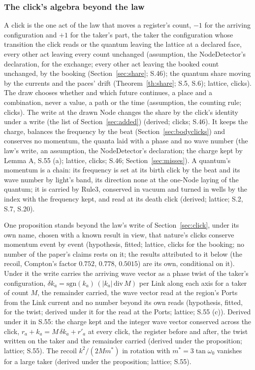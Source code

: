 \documentclass[pdflatex,sn-mathphys-num]{sn-jnl}
\theoremstyle{thmstyleone}
\theoremstyle{thmstyletwo}
\begin{document}
\subsubsection{The click's algebra beyond the law}\label{sec:clickalgebra}

A click is the one act of the law that moves a register's count, $-1$ for the arriving configuration and $+1$ for the taker's part, the taker the configuration whose transition the click reads or the quantum leaving the lattice at a declared face, every other act leaving every count unchanged (assumption, the NodeDetector's declaration, for the exchange; every other act leaving the booked count unchanged, by the booking (Section~\ref{sec:share}; S.46); the quantum share moving by the currents and the paces' drift (Theorem~\ref{th:share}; S.5, S.6); lattice, clicks). The draw chooses whether and which future continues, a place and a combination, never a value, a path or the time (assumption, the counting rule; clicks). The write at the drawn Node changes the share by the click's identity under a write (the list of Section~\ref{sec:added}) (derived; clicks; S.46). It keeps the charge, balances the frequency by the beat (Section~\ref{sec:bodyclicks}) and conserves no momentum, the quanta laid with a phase and no wave number (the law's write, an assumption, the NodeDetector's declaration; the charge kept by Lemma A, S.55 (a); lattice, clicks; S.46; Section~\ref{sec:misses}). A quantum's momentum is a chain: its frequency is set at its birth click by the beat and its wave number by light's band, its direction none at the one-Node laying of the quantum; it is carried by Rule3, conserved in vacuum and turned in wells by the index with the frequency kept, and read at its death click (derived; lattice; S.2, S.7, S.20).

One proposition stands beyond the law's write of Section~\ref{sec:click}, under its own name, chosen with a known result in view, that nature's clicks conserve momentum event by event \cite{comptonsimon} (hypothesis, fitted; lattice, clicks for the booking; no number of the paper's claims rests on it; the results attributed to it below (the recoil, Compton's factor $0.752$, $0.778$, $0.5015$) are its own, conditional on it). Under it the write carries the arriving wave vector as a phase twist of the taker's configuration, $\delta k_a = \mathrm{sgn}(k_a)\,(|k_a|\,\mathrm{div}\,M)$ per Link along each axis for a taker of count $M$, the remainder carried, the wave vector read at the region's Ports from the Link current and no number beyond its own reads (hypothesis, fitted, for the twist; derived under it for the read at the Ports; lattice; S.55 (c)). Derived under it in S.55: the charge kept and the integer wave vector conserved across the click, $r_a + k_a = M\,\delta k_a + r'_a$ at every click, the register before and after, the twist written on the taker and the remainder carried (derived under the proposition; lattice; S.55). The recoil $k^2 / (2 M m^*)$ in rotation with $m^* = 3\tan\omega_0$ vanishes for a large taker (derived under the proposition; lattice; S.55).
\end{document}
